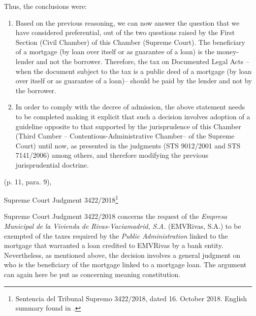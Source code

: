				Thus, the conclusions were:
				\begin{itquote}
					\begin{enumerate}
						\item Based on the previous reasoning, we can now answer the question that we have considered preferential, out of the two questions raised by the First Section (Civil Chamber) of this Chamber (Supreme Court). The beneficiary of a mortgage (by loan over itself or as guarantee of a loan) is the money-lender and not the borrower. Therefore, the tax on Documented Legal Acts –when the document subject to the tax is a public deed of a mortgage (by loan over itself or as guarantee of a loan)– should be paid by the lender and not by the borrower.
						\item In order to comply with the decree of admission, the above statement needs to be completed making it explicit that such a decision involves adoption of a guideline opposite to that supported by the jurisprudence of this Chamber (Third Camber – Contentious-Administrative Chamber– of the Supreme Court) until now, as presented in the judgments (STS 9012/2001 and STS 7141/2006) among others, and therefore modifying the previous jurisprudential doctrine.
					\end{enumerate}
				\end{itquote} 
				\hfill (p. 11, para. 9), 
				
				\hfill Supreme Court Judgment 3422/2018\footnote{Sentencia del Tribunal Supremo 3422/2018, dated 16. October 2018. English summary found in \textcite[pp. 249-252]{martinez2022elements}.} \medskip	
				
				Supreme Court Judgment 3422/2018 concerns the request of the \textit{Empresa Municipal de la Vivienda de Rivas-Vaciamadrid, S.A.} (EMVRivas, S.A.) to be exempted of the taxes required by the \textit{Public Administration} linked to the mortgage that warranted a loan credited to EMVRivas by a bank entity. Nevertheless, as mentioned above, the decision involves a general judgment on who is the beneficiary of the mortgage linked to a mortgage loan. The argument can again here be put as concerning meaning constitution.
				
